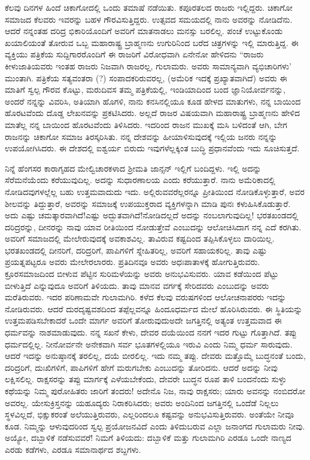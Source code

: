 ಕೆಲವು ದಿನಗಳ ಹಿಂದೆ ಚಿಕಾಗೋದಲ್ಲಿ ಒಂದು ತಮಾಷೆ ನಡೆಯಿತು. ಕಪೂರತಲದ ರಾಜರು ಇಲ್ಲಿದ್ದರು. ಚಿಕಾಗೋ ಸಮಾಜದ ಕೆಲವರು ಇವರನ್ನು ಬಹಳ ಗೌರವಿಸುತ್ತಿದ್ದರು. ಉತ್ಸವದ ಸಮಯದಲ್ಲಿ ನಾನು ಅವರನ್ನು ನೋಡಿದೆನು. ಆದರೆ ನನ್ನಂತಹ ದರಿದ್ರ ಭಿಕಾರಿಯೊಂದಿಗೆ ಅವರಿಗೆ ಮಾತನಾಡಲು ಮನಸ್ಸು ಬರಲಿಲ್ಲ. ಪಂಚೆ ಉಟ್ಟುಕೊಂಡು ಖಯಾಲಿಯಂತೆ ತೋರುವ ಒಬ್ಬ ಮಹಾರಾಷ್ಟ್ರ ಬ್ರಾಹ್ಮಣನು ಉಗುರಿನಿಂದ ಬರೆದ ಚಿತ್ರಗಳನ್ನು ಇಲ್ಲಿ ಮಾರುತ್ತಿದ್ದ. ಈ ವ್ಯಕ್ತಿಯು ಪತ್ರಿಕೆಯ ಸುದ್ದಿಗಾರರೊಂದಿಗೆ ಈ ರಾಜರಿಗೆ ವಿರೋಧವಾಗಿ ಏನೇನೋ ಹೇಳಿದನು \enginline{-} “ರಾಜರು ಕೀಳುಜಾತಿಯವರು ಇಂತಹ ರಾಜರು ನಿಜವಾಗಿ ರಾಜರಲ್ಲ, ಗುಲಾಮರು. ಅವರು ಸಾಮಾನ್ಯವಾಗಿ ವ್ಯಭಿಚಾರಿಗಳು’ ಮುಂತಾಗಿ. ಪತ್ರಿಕೆಯ ಸತ್ಯವಂತರಾ (?) ಸಂಪಾದಕರಿರುವರಲ್ಲ, (ಅಮೆರಿಕ ಇದಕ್ಕೆ ಪ್ರಖ್ಯಾತವಾಗಿದೆ) ಅವರು ಈ ಮಾತಿಗೆ ಸ್ವಲ್ಪ ಗೌರವ ಕೊಟ್ಟು, ಮರುದಿವಸ ತಮ್ಮ ಪತ್ರಿಕೆಯಲ್ಲಿ, ಇಂಡಿಯಾದಿಂದ ಬಂದ ಜ್ಞಾನಿಯೋರ್ವನನ್ನು, ಅಂದರೆ ನನ್ನನ್ನು ವಿವರಿಸಿ, ಅತಿಯಾಗಿ ಹೊಗಳಿ, ನಾನು ಕನಸಿನಲ್ಲಿಯೂ ಕೂಡ ಹೇಳದ ಮಾತುಗಳು, ನನ್ನ ಬಾಯಿಂದ ಹೊರಟವೆಂದು ದೊಡ್ಡ ಲೇಖನವನ್ನು ಪ್ರಕಟಿಸಿದರು. ಅಲ್ಲದೆ ರಾಜರ ವಿಷಯವಾಗಿ ಮಹಾರಾಷ್ಟ್ರ ಬ್ರಾಹ್ಮಣನು ಹೇಳಿದ ಮಾತೆಲ್ಲ ನನ್ನ ಬಾಯಿಂದ ಹೊರಟವೆಂದು ತಿಳಿಸಿದರು. ಇದರಿಂದ ರಾಜನ ಮುಖಕ್ಕೆ ಮಸಿ ಬಳಿದಂತೆ ಆಗಿ, ಬೇಗ ರಾಜನನ್ನು ಚಿಕಾಗೋ ಸಮಾಜ ತಿರಸ್ಕರಿಸಿತು. ನನ್ನ ದೇಶವನ್ನು ಹೀಯಾಳಿಸುವುದಕ್ಕೆ ಇಲ್ಲಿಯ ಜನರು ನನ್ನನ್ನು ಉಪಯೋಗಿಸಿದರು. ಈ ದೇಶದಲ್ಲಿ ಐಶ್ವರ್ಯ ಬಿರುದು ಇವುಗಳೆಲ್ಲಕ್ಕಿಂತ ಬುದ್ಧಿ ಪ್ರಧಾನವೆಂದು ಇದು ಸೂಚಿಸುತ್ತದೆ.

ನಿನ್ನೆ ಹೆಂಗಸರ ಕಾರಾಗೃಹದ ಮೇಲ್ವಿಚಾರಕಳಾದ ಶ‍್ರೀಮತಿ ಜಾನ್ಸನ್ ಇಲ್ಲಿಗೆ ಬಂದಿದ್ದಳು. ಇಲ್ಲಿ ಅದನ್ನು ಸೆರೆಮನೆಯೆಂದು ಕರೆಯುವುದಿಲ್ಲ. ಅದನ್ನು ಸುಧಾರಣಾಲಯ  ಎಂದು ಕರೆಯುತ್ತಾರೆ. ನಾನು ಅಮೆರಿಕಾದಲ್ಲಿ ನೋಡಿದವುಗಳಲ್ಲೆಲ್ಲ ಬಹು ಉತ್ತಮವಾದುದು ಇದು. ಅಲ್ಲಿರುವವರೆಲ್ಲರನ್ನೂ ಪ್ರೀತಿಯಿಂದ ನೋಡಿಕೊಳ್ಳುತ್ತಾರೆ, ಅವರ ಶೀಲವನ್ನು ತಿದ್ದುತ್ತಾರೆ, ಅವರನ್ನು ಸಮಾಜಕ್ಕೆ ಉಪಯುಕ್ತರಾದ ವ್ಯಕ್ತಿಗಳನ್ನಾಗಿ ಮಾಡಿ ಪುನಃ ಕಳುಹಿಸಿಕೊಡುತ್ತಾರೆ. ಅದು ಎಷ್ಟು ಚಮತ್ಕಾರವಾಗಿದೆ!ಎಷ್ಟು ಅದ್ಭುತವಾಗಿದೆ!ನೋಡಿದಲ್ಲದೆ ಅದನ್ನು ನಂಬಲಾಗುವುದಿಲ್ಲ! ಭರತಖಂಡದಲ್ಲಿ ದರಿದ್ರರನ್ನು, ದೀನರನ್ನು ನಾವು ಯಾವ ರೀತಿಯಿಂದ ನೋಡುತ್ತೇವೆ ಎಂಬುದನ್ನು ಆಲೋಚಿಸಿದಾಗ ನನ್ನ ಎದೆ ಕರಗಿತು. ಅವರಿಗೆ ಸಮಾಜದಲ್ಲಿ ಮೇಲೇರುವುದಕ್ಕೆ ಅವಕಾಶವಿಲ್ಲ. ತಾವಿರುವ ಕಷ್ಟದಿಂದ ತಪ್ಪಿಸಿಕೊಳ್ಳಲು ದಾರಿಯಿಲ್ಲ. ಭರತಖಂಡದಲ್ಲಿ ದೀನರಿಗೆ, ದರಿದ್ರರಿಗೆ, ಪಾಪಿಗಳಿಗೆ ಸ್ನೇಹಿತರಿಲ್ಲ, ಅವರಿಗೆ ಸಹಾಯಕರಿಲ್ಲ. ತಾವು ಎಷ್ಟು ಪ್ರಯತ್ನಪಟ್ಟರೂ ಅವರು ಮೇಲೇರಲಾರರು. ಪ್ರತಿದಿನವೂ ಅವರು ಅಧಃಪಾತಾಳಕ್ಕೆ ಹೋಗುತ್ತಿರುವರು. ಕ್ರೂರಸಮಾಜದಿಂದ ಬೀಳುವ ಪೆಟ್ಟಿನ ಸುರಿಮಳೆಯನ್ನು ಅವರು ಅನುಭವಿಸುವರು. ಯಾವ ಕಡೆಯಿಂದ ಪೆಟ್ಟು ಬೀಳುತ್ತಿದೆ ಎನ್ನುವುದೂ ಅವರಿಗೆ ತಿಳಿಯದು. ತಾವು ಮಾನವ ವರ್ಗಕ್ಕೆ ಸೇರಿದವರು ಎಂಬುದನ್ನು ಅವರು ಮರೆತಿರುವರು. ಇದರ ಪರಿಣಾಮವೇ ಗುಲಾಮಗಿರಿ. ಕಳೆದ ಕೆಲವು ವರುಷಗಳಿಂದ ಆಲೋಚನಾಪರರು ಇದನ್ನು ನೋಡಿರುವರು. ಆದರೆ ದುರದೃಷ್ಟವಶದಿಂದ ತಪ್ಪೆಲ್ಲವನ್ನೂ ಹಿಂದೂಧರ್ಮದ ಮೇಲೆ ಹೊರಿಸಿರುವರು. ಈ ಸ್ಥಿತಿಯನ್ನು ಉತ್ತಮಪಡಿಸಬೇಕಾದರೆ ಒಂದೇ ಮಾರ್ಗ ಅವರಿಗೆ ತೋರುವುದು\enginline{-}ಅದೇ ಜಗತ್ತಿನಲ್ಲಿ ಅತ್ಯಂತ ಉತ್ತಮವಾದ ಈ ಧರ್ಮವನ್ನು ನಾಶಮಾಡುವುದು. ನನ್ನ ಸಖನೆ ಕೇಳು, ದೇವರ ದಯೆಯಿಂದ ನನಗೆ ಇದರ ಗುಟ್ಟು ಗೊತ್ತಾಗಿದೆ. ತಪ್ಪು ಧರ್ಮದಲ್ಲಿಲ್ಲ. ನೀನೋರ್ವನೇ ಅನೇಕವಾಗಿ ಸರ್ವ ಭೂತಗಳಲ್ಲಿಯೂ ಇರುವಿ ಎಂದು ನಿಮ್ಮ ಧರ್ಮ ಸಾರುವುದು. ಆದರೆ ಇದನ್ನು ಅನುಷ್ಠಾನಕ್ಕೆ ತರಲಿಲ್ಲ, ದಯೆ ಬೀರಲಿಲ್ಲ. ಇದು ನಮ್ಮ ತಪ್ಪು. ದೇವರು ಮತ್ತೊಮ್ಮೆ ಬುದ್ಧನಂತೆ ಬಂದು, ದರಿದ್ರರಿಗೆ, ದುಃಖಿಗಳಿಗೆ, ಪಾಪಿಗಳಿಗೆ ಹೇಗೆ ಮರುಗಬೇಕು ಎಂಬುದನ್ನು ತೋರಿದನು. ಆದರೆ ಅದನ್ನು ನೀವು ಲಕ್ಷಿಸಲಿಲ್ಲ. ರಾಕ್ಷಸರನ್ನು ತಪ್ಪು ಮಾರ್ಗಕ್ಕೆ ಎಳೆಯಬೇಕೆಂದು, ದೇವರೇ ಬುದ್ಧನ ರೂಪ ತಾಳಿ ಬಂದನೆಂದು ಸುಳ್ಳು ಕಥೆಯನ್ನು ನಿಮ್ಮ ಪುರೋಹಿತರು ಜಾರಿಗೆ ತಂದರು! ಅದೇನೊ ನಿಜ, ನಾವು ರಾಕ್ಷಸರು; ಯಾರು ಅವನನ್ನು ನಂಬಿದರೋ ಅವರಲ್ಲ. ಯೇಸುಕ್ರಿಸ್ತನನ್ನು ಯಹೂದ್ಯರು ನಿರಾಕರಿಸಿದರು; ಅವರು ಅಂದಿನಿಂದ ಜಗತ್ತಿನಲ್ಲಿ ಒಂದೆಡೆ ನಿಲ್ಲಲು ಸ್ಥಳವಿಲ್ಲದೆ, ಭಿಕ್ಷುಕರಂತೆ ಅಲೆಯುತ್ತಿರುವರು, ಎಲ್ಲರಿಂದಲೂ ಕಷ್ಟವನ್ನು ಅನುಭವಿಸುತ್ತಿರುವರು. ಅಂತೆಯೇ ನೀವೂ ಕೂಡ. ನಿಮ್ಮನ್ನು ಆಳುವುದರಿಂದ ಸ್ವಲ್ಪ ಪ್ರಯೋಜನವಿದೆ ಎಂದು ತಿಳಿದುಬರುವ ಎಲ್ಲಾ ಜನಾಂಗದ ಗುಲಾಮರು ನೀವು. ಅಯ್ಯೋ, ದಬ್ಬಾಳಿಕೆ ನಡೆಸುವವರೆ! ನಿಮಗೆ ತಿಳಿಯದು: ದಬ್ಬಾಳಿಕೆ ಮತ್ತು ಗುಲಾಮಗಿರಿ ಎರಡೂ ಒಂದೇ ನಾಣ್ಯದ ಎರಡು ಕಡೆಗಳು, ಎರಡೂ ಸಮಾನಾರ್ಥದ ಶಬ್ದಗಳು.

